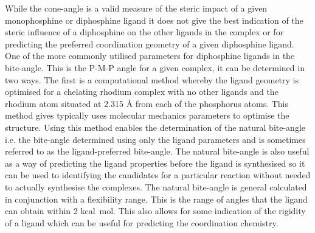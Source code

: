 While the cone-angle is a valid measure of the steric impact of a given monophosphine or diphosphine ligand it does not give the best indication of the steric influence of a diphosphine on the other ligands in the complex or for predicting the preferred coordination geometry of a given diphosphine ligand.  One of the more commonly utilised parameters for diphosphine ligands in the bite-angle.  This is the P-M-P angle for a given complex, it can be determined in two ways.  The first is a computational method whereby the ligand geometry is optimised for a chelating rhodium complex with no other ligands and the  rhodium atom situated at 2.315 \si{\angstrom} from each of the phosphorus atoms.  This method gives typically uses molecular mechanics parameters to optimise the structure.  Using this method enables the determination of the natural bite-angle i.e. the bite-angle determined using only the ligand parameters and is sometimes referred to as the ligand-preferred bite-angle.  The natural bite-angle is also useful as a way of predicting the ligand properties before the ligand is synthesised so it can be used to identifying the candidates for a particular reaction without needed to actually synthesise the complexes.  The natural bite-angle is general calculated in conjunction with a flexibility range.  This is the range of angles that the ligand can obtain within 2 kcal\si{\per\mol}.  This also allows for some indication of the rigidity of a ligand which can be useful for predicting the coordination chemistry.  

